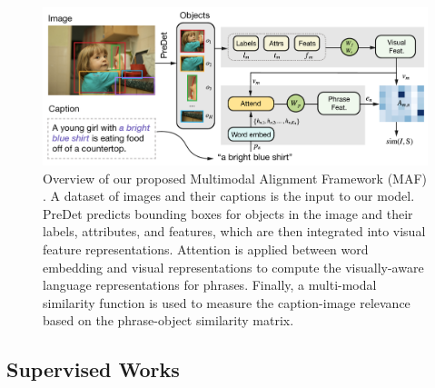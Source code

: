 \begin{figure}
  \centering
  \includegraphics[width=.8\textwidth]{figures/maf-model.png}
  \caption[Multimodal Alignment Framework model overview]{Overview
  of our proposed Multimodal Alignment Framework (MAF)
  \cite{wang2020maf}. A dataset of images and their captions is the
  input to our model. PreDet predicts bounding boxes for objects in
  the image and their labels, attributes, and features, which are
  then integrated into visual feature representations. Attention is
  applied between word embedding and visual representations to
  compute the visually-aware language representations for phrases.
  Finally, a multi-modal similarity function is used to measure the
  caption-image relevance based on the phrase-object similarity
  matrix.}
  \label{fig:maf-model}
\end{figure}

\subsection{Supervised Works}
\label{subsec:related-full-grounding}

